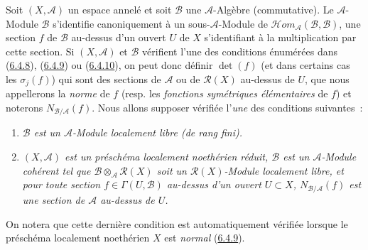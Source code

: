\begin{env}[6.5.1]
\label{II.6.5.1-fr}
Soit $(X,\mathcal{A})$ un espace annelé et soit $\mathcal{B}$ une
$\mathcal{A}$-Algèbre (commutative). Le $\mathcal{A}$-Module $\mathcal{B}$
s'identifie canoniquement à un sous-$\mathcal{A}$-Module de
$\mathcal{H}om_{\mathcal{A}}(\mathcal{B},\mathcal{B})$, une section $f$ de
$\mathcal{B}$ au-dessus d'un ouvert $U$ de $X$ s'identifiant à la
multiplication par cette section. Si $(X,\mathcal{A})$ et $\mathcal{B}$
vérifient l'une des conditions énumérées dans
(\hyperref[II.6.4.8-fr]{6.4.8}), (\hyperref[II.6.4.9-fr]{6.4.9}) ou
(\hyperref[II.6.4.10-fr]{6.4.10}), on peut donc définir $\det(f)$ (et dans
certains cas les $\sigma_j(f)$) qui sont des sections de $\mathcal{A}$ ou de
$\mathcal{R}(X)$ au-dessus de $U$, que nous appellerons la \emph{norme} de
$f$ (resp. les \emph{fonctions symétriques élémentaires} de $f$) et noterons
$N_{\mathcal{B}/\mathcal{A}}(f)$. Nous allons supposer vérifiée l'\emph{une}
des conditions suivantes~:
\begin{enumerate}
\item[(I)] \emph{$\mathcal{B}$ est un $\mathcal{A}$-Module localement libre
(de rang fini).}
\item[(II)] \emph{$(X,\mathcal{A})$ est un préschéma localement noethérien
réduit, $\mathcal{B}$ est un $\mathcal{A}$-Module cohérent tel que
$\mathcal{B}\otimes_{\mathcal{A}}\mathcal{R}(X)$ soit un
$\mathcal{R}(X)$-Module localement libre, et pour toute section
$f\in\Gamma(U,\mathcal{B})$ au-dessus d'un ouvert $U\subset X$,
$N_{\mathcal{B}/\mathcal{A}}(f)$ est une section de $\mathcal{A}$ au-dessus
de $U$.}
\end{enumerate}


On notera que cette dernière condition est automatiquement vérifiée lorsque
le préschéma localement noethérien $X$ est \emph{normal}
(\hyperref[II.6.4.9-fr]{6.4.9}).


\end{env}
